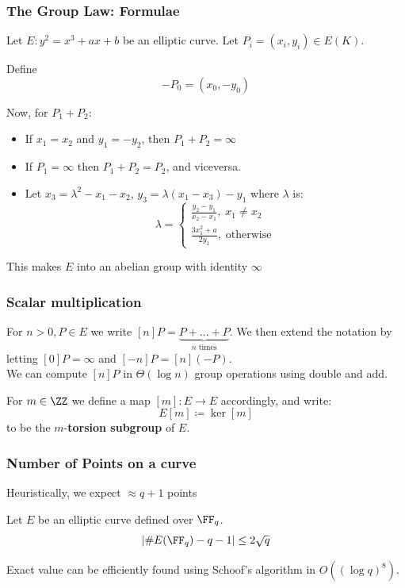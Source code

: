 \documentclass{beamer}
\begin{document}
\begin{frame}
    \frametitle{The Group Law: Formulae}
    Let $E: y^2 = x^3 + a x + b$ be an elliptic curve. Let $P_i = (x_i, y_i) \in E(K)$. 
    
    Define 
    \[ -P_0 = (x_0, -y_0 )\]
    
    Now, for $P_1 + P_2$: 
    \begin{itemize}
        \item If $x_1 = x_2$ and $y_1 = -y_2$, then $P_1 + P_2 = \infty$
        \item If $P_1 = \infty$ then $P_1 + P_2 = P_2$, and viceversa.
        \item Let $x_3 = \lambda^2 - x_1 - x_2$, $y_3 = \lambda(x_1 - x_3) - y_1$ where $\lambda$ is:
        \[ \lambda = \begin{cases}
            \frac{y_2 - y_1}{x_2 - x_1}, \; x_1 \neq x_2 \\
            \frac{3 x_1^2 + a}{2y_1},\; \text{otherwise}
        \end{cases} \]
    \end{itemize}
    
    This makes $E$ into an abelian group with identity $\infty$
\end{frame}

\begin{frame}
    \frametitle{Scalar multiplication}
    For $n > 0, P \in E$ we write $[n]P = \underbrace{P + \dots + P}_{n \text{ times}}$. We then extend the notation by letting $[0]P = \infty$ and 
    $[-n]P = [n](-P)$. \\
    

    We can compute $[n]P$ in $\Theta(\log n)$ group operations using double and add.
    
    
    For $m \in \ZZ$ we define a map $[m]: E \to E$ accordingly, and write:
    \[ E[m] \coloneqq \ker[m] \]
    to be the $m$-\textbf{torsion subgroup} of $E$.
\end{frame}

\begin{frame}
    \frametitle{Number of Points on a curve}
    Heuristically, we expect $\approx q + 1$ points
    
    \begin{theorem}[Hasse]
        Let $E$ be an elliptic curve defined over $\FF_q$.
        \[ \left|\#E(\FF_q) - q - 1\right| \leq 2 \sqrt{q} \] 
    \end{theorem}
    
    Exact value can be efficiently found using Schoof's algorithm in $O((\log q)^8)$.
\end{frame}
\end{document}
